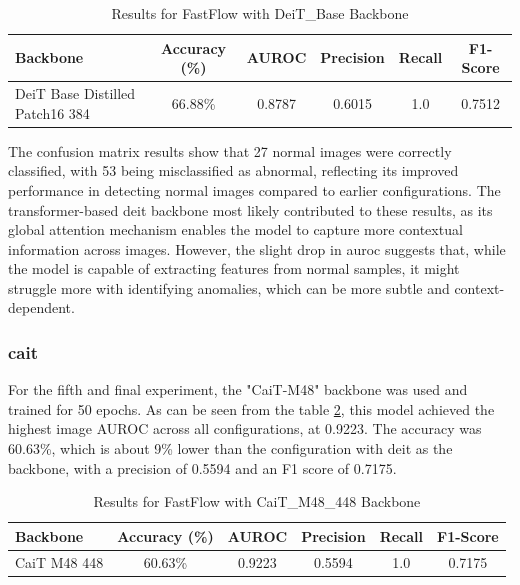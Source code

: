 \begin{table}[ht!]
    \centering
    \begin{tabular}{|l|c|c|c|c|c|}
        \hline
        \textbf{Backbone} & \textbf{Accuracy (\%)} & \textbf{AUROC} & \textbf{Precision} & \textbf{Recall} & \textbf{F1-Score} \\ \hline
        DeiT Base Distilled Patch16 384 & 66.88\% & 0.8787 & 0.6015 & 1.0 & 0.7512 \\ \hline
    \end{tabular}
    \caption{Results for FastFlow with DeiT\_Base Backbone}
    \label{tab:fastflow deit-base}
\end{table}

The confusion matrix results show that 27 normal images were correctly classified, with 53 being misclassified as abnormal, reflecting its improved performance in detecting normal images compared to earlier configurations. The transformer-based \gls{deit} backbone most likely contributed to these results, as its global attention mechanism enables the model to capture more contextual information across images. However, the slight drop in \gls{auroc} suggests that, while the model is capable of extracting features from normal samples, it might struggle more with identifying anomalies, which can be more subtle and context-dependent.

\subsubsection*{\gls{cait}}

For the fifth and final experiment, the "CaiT-M48" backbone was used and trained for 50 epochs. As can be seen from the table \ref{tab:fastflow cait}, this model achieved the highest image AUROC across all configurations, at 0.9223. The accuracy was 60.63\%, which is about 9\% lower than the configuration with \gls{deit} as the backbone, with a precision of 0.5594 and an F1 score of 0.7175.

\begin{table}[ht!]
    \centering
    \begin{tabular}{|l|c|c|c|c|c|}
        \hline
        \textbf{Backbone} & \textbf{Accuracy (\%)} & \textbf{AUROC} & \textbf{Precision} & \textbf{Recall} & \textbf{F1-Score} \\ \hline
        CaiT M48 448 & 60.63\% & 0.9223 & 0.5594 & 1.0 & 0.7175 \\ \hline
    \end{tabular}
    \caption{Results for FastFlow with CaiT\_M48\_448 Backbone}
    \label{tab:fastflow cait}
\end{table}

